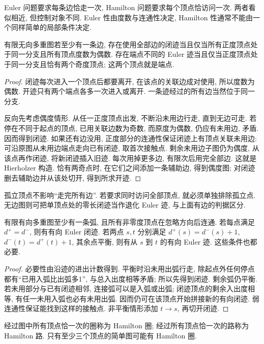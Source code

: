 \label{ch:eulerhamilton}
Euler 问题要求每条边恰走一次, Hamilton 问题要求每个顶点恰访问一次. 两者看似相近, 但控制对象不同. Euler 性由度数与连通性决定, Hamilton 性通常不能由一个同样简单的局部条件决定.
\begin{theorem}[无向 Euler 判据]\label{thm:euler}
有限无向多重图若至少有一条边, 存在使用全部边的闭迹当且仅当所有正度顶点处于同一分支且所有顶点度数为偶数. 存在端点不同的 Euler 迹当且仅当正度顶点处于同一分支且恰有两个奇度顶点; 这两个顶点就是端点.
\end{theorem}
\begin{proof}
闭迹每次进入一个顶点后都要离开, 在该点的关联边成对使用, 所以度数为偶数. 开迹只有两个端点各多一次进入或离开. 一条迹经过的所有边当然位于同一分支.

反向先考虑偶度情形. 从任一正度顶点出发, 不断沿未用边行走, 直到无边可走. 若停在不同于起点的顶点, 已用关联边数为奇数, 而原度为偶数, 仍应有未用边, 矛盾. 因而得到闭迹. 如果还有边没用, 正度部分的连通性保证闭迹上有顶点关联未用边: 可沿原图从未用边端点走向已有闭迹, 取首次接触点. 剩余未用边子图仍为偶度, 从该点再作闭迹, 将新闭迹插入旧迹. 每次用掉更多边, 有限次后用完全部边. 这就是 Hierholzer 构造. 恰有两奇点时, 在它们之间添加一条辅助边, 得到偶度图; 对闭迹删去辅助边并从该处切开, 得到所求开迹.
\end{proof}
孤立顶点不影响“走完所有边”. 若要求同时访问全部顶点, 就必须单独排除孤立点. 无边图则可把单顶点处的零长闭迹当作退化 Euler 迹, 与上面有边的判据区分.
\begin{theorem}[有向 Euler 判据]\label{thm:directedeuler}
有限有向多重图至少有一条弧, 且所有非零度顶点在忽略方向后连通. 若每点满足 $d^+=d^-$, 则有有向 Euler 闭迹. 若两点 $s,t$ 分别满足 $d^+(s)=d^-(s)+1$, $d^-(t)=d^+(t)+1$, 其余点平衡, 则有从 $s$ 到 $t$ 的有向 Euler 迹. 这些条件也都必要.
\end{theorem}
\begin{proof}
必要性由沿迹的进出计数得到. 平衡时沿未用出弧行走, 除起点外任何停点都有“已用入弧比出弧多1”, 与总入出度相等矛盾; 所以先得到闭迹. 剩余弧仍平衡. 若未用部分与已有闭迹相邻, 连接弧可以是入弧或出弧; 闭迹顶点的剩余入出度相等, 有任一未用入弧也必有未用出弧. 因而仍可在该顶点开始拼接新的有向闭迹. 弱连通性保证能找到这样的接触点. 非平衡情形添加 $t\to s$, 再切开闭迹.
\end{proof}
\begin{definition}
经过图中所有顶点恰一次的圈称为 Hamilton 圈; 经过所有顶点恰一次的路称为 Hamilton 路. 只有至少三个顶点的简单图可能有 Hamilton 圈.
\end{definition}
